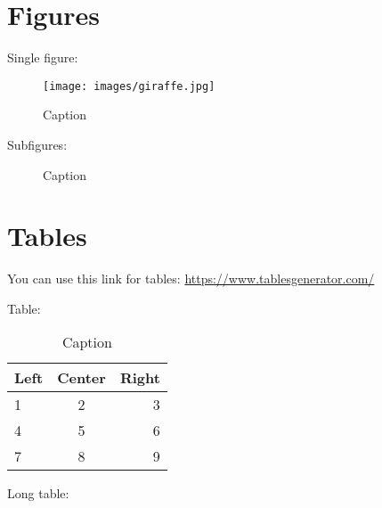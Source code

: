 \section{Figures}
Single figure:
\begin{figure}[H] %
  \centering
  \texttt{[image: images/giraffe.jpg]}
  \caption[]{Caption}
  \label{fig:label}
\end{figure}

Subfigures:
\begin{figure}[H] %
  \centering
  \hspace{0.1cm}
  \caption[]{Caption}
  \label{fig:label}
\end{figure}

\section{Tables}
You can use this link for tables: \url{https://www.tablesgenerator.com/}

Table:
\begin{table}[H]
  \centering
  {
    \begin{tabular}{|l|c|r|}
      \hline
      \textbf{Left} & \textbf{Center} & \textbf{Right} \\ \hline \hline
      1 & 2 & 3 \\ \hline
      4 & 5 & 6 \\ \hline
      7 & 8 & 9 \\ \hline

  \end{tabular}}
  \caption{Caption}
  \label{tab:label}
\end{table}

Long table:
\begin{table}[H]
  \centering
  \caption{Caption}
  \label{tab:label}
\end{table}

